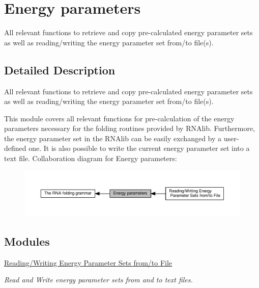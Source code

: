 \hypertarget{group__energy__parameters}{}\section{Energy parameters}
\label{group__energy__parameters}


All relevant functions to retrieve and copy pre-\/calculated energy parameter sets as well as reading/writing the energy parameter set from/to file(s).  




\subsection{Detailed Description}
All relevant functions to retrieve and copy pre-\/calculated energy parameter sets as well as reading/writing the energy parameter set from/to file(s). 

This module covers all relevant functions for pre-\/calculation of the energy parameters necessary for the folding routines provided by R\+N\+Alib. Furthermore, the energy parameter set in the R\+N\+Alib can be easily exchanged by a user-\/defined one. It is also possible to write the current energy parameter set into a text file. Collaboration diagram for Energy parameters\+:
\nopagebreak
\begin{figure}[H]
\begin{center}
\leavevmode
\includegraphics[width=350pt]{group__energy__parameters}
\end{center}
\end{figure}
\subsection*{Modules}
\begin{DoxyCompactItemize}
\item 
\hyperlink{group__energy__parameters__rw}{Reading/\+Writing Energy Parameter Sets from/to File}
\begin{DoxyCompactList}\small\item\em Read and Write energy parameter sets from and to text files. \end{DoxyCompactList}\end{DoxyCompactItemize}
